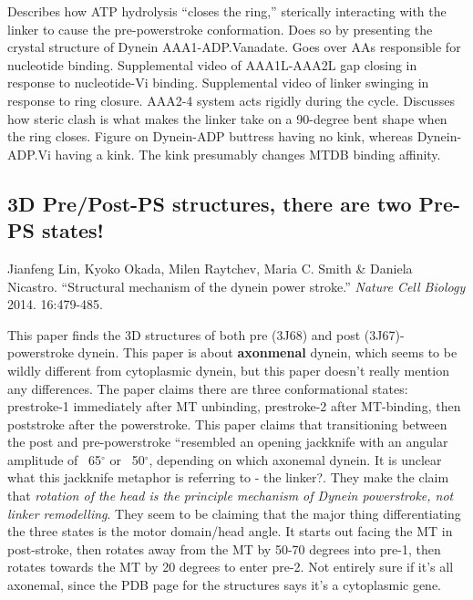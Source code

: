 \documentclass[10pt]{article} %
\begin{document}
Describes how ATP hydrolysis ``closes the ring,'' sterically interacting with the linker to cause the pre-powerstroke conformation. Does so by presenting the crystal structure of Dynein AAA1-ADP.Vanadate. Goes over AAs responsible for nucleotide binding. Supplemental video of AAA1L-AAA2L gap closing in response to nucleotide-Vi binding. Supplemental video of linker swinging in response to ring closure. AAA2-4 system acts rigidly during the cycle. Discusses how steric clash is what makes the linker take on a 90-degree bent shape when the ring closes. Figure on Dynein-ADP buttress having no kink, whereas Dynein-ADP.Vi having a kink. The kink presumably changes MTDB binding affinity.

\subsection{3D Pre/Post-PS structures, there are two Pre-PS states!}
Jianfeng Lin, Kyoko Okada, Milen Raytchev, Maria C. Smith \& Daniela Nicastro. ``Structural mechanism of the dynein power stroke.'' \textit{Nature Cell Biology} 2014. 16:479-485.

This paper finds the 3D structures of both pre (3J68) and post (3J67)-powerstroke dynein. This paper is about \textbf{axonmenal} dynein, which seems to be wildly different from cytoplasmic dynein, but this paper doesn't really mention any differences. The paper claims there are three conformational states: prestroke-1 immediately after MT unbinding, prestroke-2 after MT-binding, then poststroke after the powerstroke. This paper claims that transitioning between the post and pre-powerstroke ``resembled an opening jackknife with an angular amplitude of ~65$^{\circ}$ or ~50$^{\circ}$, depending on which axonemal dynein. It is unclear what this jackknife metaphor is referring to - the linker?. They make the claim that \textit{rotation of the head is the principle mechanism of Dynein powerstroke, not linker remodelling}. They seem to be claiming that the major thing differentiating the three states is the motor domain/head angle. It starts out facing the MT in post-stroke, then rotates away from the MT by 50-70 degrees into pre-1, then rotates towards the MT by 20 degrees to enter pre-2. Not entirely sure if it's all axonemal, since the PDB page for the structures says it's a cytoplasmic gene.\\
\end{document}
